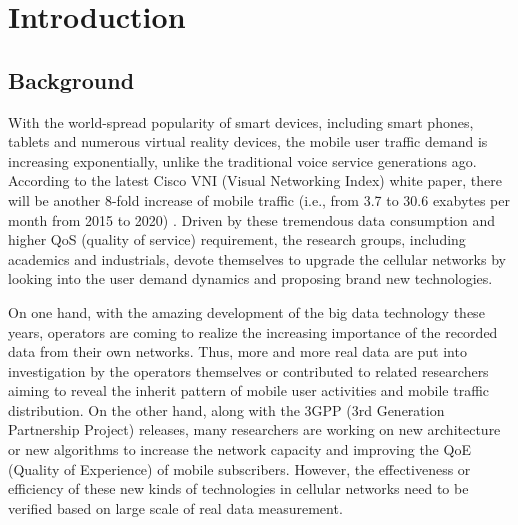
\chapter{Introduction} %

\minitoc

\label{Chapter1} %




\section{Background}

With the world-spread popularity of smart devices, including smart phones, tablets and numerous virtual reality devices, the mobile user traffic demand is increasing exponentially, unlike the traditional voice service generations ago. According to the latest Cisco VNI (Visual Networking Index) white paper, there will be another 8-fold increase of mobile traffic (i.e., from 3.7 to 30.6 exabytes per month from 2015 to 2020) \cite{vni2016}. Driven by these tremendous data consumption and higher QoS (quality of service) requirement, the research groups, including academics and industrials, devote themselves to upgrade the cellular networks by looking into the user demand dynamics and proposing brand new technologies.

On one hand, with the amazing development of the big data technology these years, operators are coming to realize the increasing importance of the recorded data from their own networks. Thus, more and more real data are put into investigation by the operators themselves or contributed to related researchers aiming to reveal the inherit pattern of mobile user activities and mobile traffic distribution. On the other hand, along with the 3GPP (3rd Generation Partnership Project) releases, many researchers are working on new architecture or new algorithms to increase the network capacity and improving the QoE (Quality of Experience) of mobile subscribers. However, the effectiveness or efficiency of these new kinds of technologies in cellular networks need to be verified based on large scale of real data measurement.


